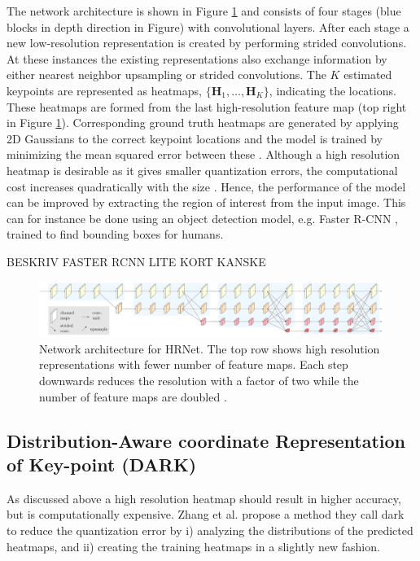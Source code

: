 The network architecture is shown in Figure \ref{fig:hrnet} and consists of four stages (blue blocks in depth direction in Figure) with convolutional layers. After each stage a new low-resolution representation is created by performing strided convolutions. At these instances the existing representations also exchange information by either nearest neighbor upsampling or strided convolutions. The $K$ estimated keypoints are represented as heatmaps, $\{\mathbf{H}_1, \hdots, \mathbf{H}_K\}$, indicating the locations. These heatmaps are formed from the last high-resolution feature map (top right in Figure \ref{fig:hrnet}). Corresponding ground truth heatmaps are generated by applying 2D Gaussians to the correct keypoint locations and the model is trained by minimizing the mean squared error between these \cite{Sun2019}. Although a high resolution heatmap is desirable as it gives smaller quantization errors, the computational cost increases quadratically with the size \cite{Zhang2020}. Hence, the performance of the model can be improved by extracting the region of interest from the input image. This can for instance be done using an object detection model, e.g. Faster R-CNN \cite{Ren2017}, trained to find bounding boxes for humans.

BESKRIV FASTER RCNN LITE KORT KANSKE

\begin{figure}
 \centering
 \includegraphics[width=\textwidth]{files/figs/hrnet.png}
 \caption{Network architecture for HRNet. The top row shows high resolution representations with fewer number of feature maps. Each step downwards reduces the resolution with a factor of two while the number of feature maps are doubled \cite{Wang2020}.}
 \label{fig:hrnet}
\end{figure}

\subsection{Distribution-Aware coordinate Representation of Key-point (DARK)} \label{sec:dark}
As discussed above a high resolution heatmap should result in higher accuracy, but is computationally expensive. Zhang et al. \cite{Zhang2020} propose a method they call \gls{dark} to reduce the quantization error by i) analyzing the distributions of the predicted heatmaps, and ii) creating the training heatmaps in a slightly new fashion.

